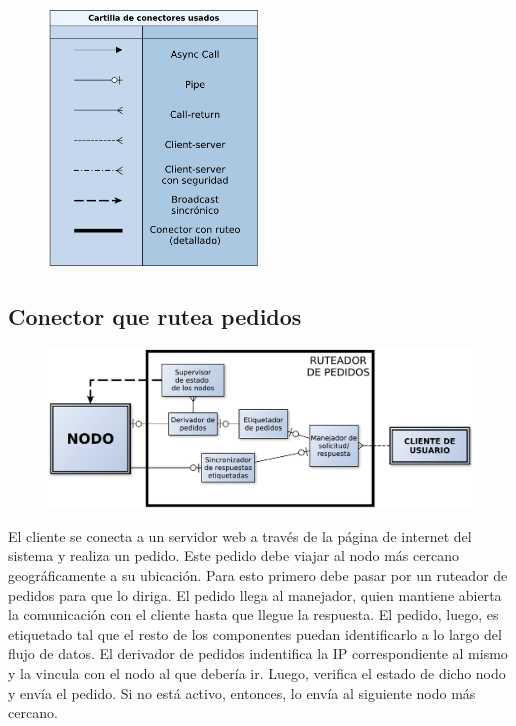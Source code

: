 \begin{figure}[H]
\centering
\includegraphics[width=0.5\textwidth]{graph/cartilla.pdf}
\end{figure}


\subsection{Conector que rutea pedidos}

\begin{figure}[H]
\centering
\includegraphics[width=\textwidth]{graph/conector.pdf}
\end{figure}

El cliente se conecta a un servidor web a través de la página de internet del sistema y realiza un pedido. Este pedido debe viajar al nodo más cercano geográficamente a su ubicación. Para esto primero debe pasar por un ruteador de pedidos para que lo diriga.
El pedido llega al manejador, quien mantiene abierta la comunicación con el cliente hasta que llegue la respuesta. El pedido, luego, es etiquetado tal que el resto de los componentes puedan identificarlo a lo largo del flujo de datos. El derivador de pedidos indentifica la IP correspondiente al mismo y la vincula con el nodo al que debería ir. Luego, verifica el estado de dicho nodo y envía el pedido. Si no está activo, entonces, lo envía al siguiente nodo más cercano.

